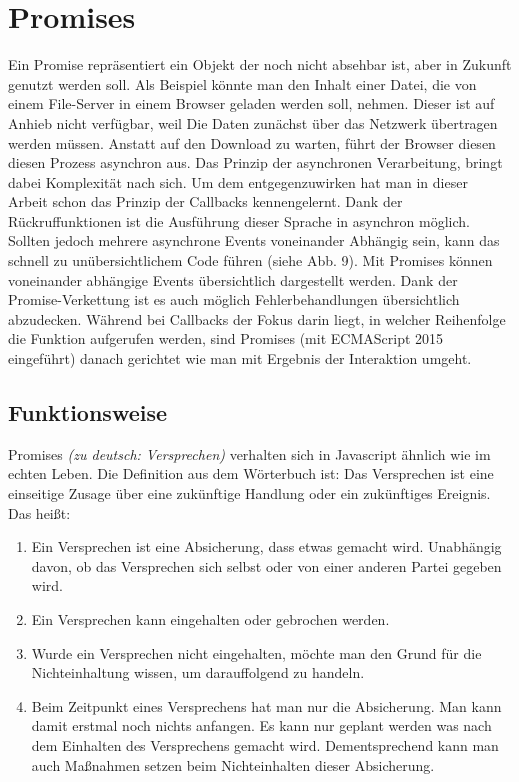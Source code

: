 \section{Promises}

Ein Promise repräsentiert ein Objekt der noch nicht absehbar ist, aber in Zukunft genutzt werden soll. Als Beispiel könnte man den Inhalt einer Datei, die von einem File-Server in einem Browser geladen werden soll, nehmen. Dieser ist auf Anhieb nicht verfügbar, weil Die Daten zunächst über das Netzwerk übertragen werden müssen. Anstatt auf den Download zu warten, führt der Browser diesen diesen Prozess asynchron aus. Das Prinzip der asynchronen Verarbeitung, bringt dabei Komplexität nach sich. Um dem entgegenzuwirken hat man in dieser Arbeit schon das Prinzip der Callbacks kennengelernt. Dank der Rückruffunktionen ist die Ausführung dieser Sprache in asynchron möglich. Sollten jedoch mehrere asynchrone Events voneinander Abhängig sein, kann das schnell zu unübersichtlichem Code führen (siehe Abb. 9). Mit Promises können voneinander abhängige Events übersichtlich dargestellt werden. Dank der Promise-Verkettung ist es auch möglich Fehlerbehandlungen übersichtlich abzudecken. Während bei Callbacks der Fokus darin liegt, in welcher Reihenfolge die Funktion aufgerufen werden, sind Promises (mit ECMAScript 2015 eingeführt) danach gerichtet wie man mit Ergebnis der Interaktion umgeht.

\subsection{Funktionsweise}

\noindent
Promises \textit{(zu deutsch: Versprechen)} verhalten sich in Javascript ähnlich wie im echten Leben. Die Definition aus dem Wörterbuch ist: Das Versprechen ist eine einseitige Zusage über eine zukünftige Handlung oder ein zukünftiges Ereignis. \cite{versprechen} \\

\noindent
Das heißt:

\begin{enumerate}
    \item Ein Versprechen ist eine Absicherung, dass etwas gemacht wird. Unabhängig davon, ob das Versprechen sich selbst oder von einer anderen Partei gegeben wird.
    
    \item Ein Versprechen kann eingehalten oder gebrochen werden.
    
    \item Wurde ein Versprechen nicht eingehalten, möchte man den Grund für die Nichteinhaltung wissen, um darauffolgend zu handeln.
    
    \item Beim Zeitpunkt eines Versprechens hat man nur die Absicherung. Man kann damit erstmal noch nichts anfangen. Es kann nur geplant werden was nach dem Einhalten des Versprechens gemacht wird. Dementsprechend kann man auch Maßnahmen setzen beim Nichteinhalten dieser Absicherung.
    
\end{enumerate}


